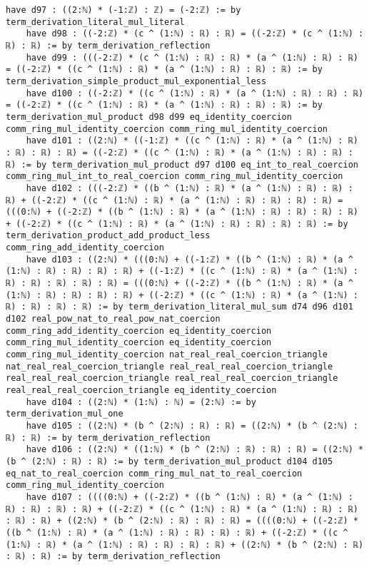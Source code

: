 \documentclass{article}
\begin{document}
\begin{tcolorbox}[colback=white!10, width=\linewidth]
\begin{lstlisting}[language=Lean4]
    have d97 : ((2:ℕ) * (-1:ℤ) : ℤ) = (-2:ℤ) := by term_derivation_literal_mul_literal
    have d98 : ((-2:ℤ) * (c ^ (1:ℕ) : ℝ) : ℝ) = ((-2:ℤ) * (c ^ (1:ℕ) : ℝ) : ℝ) := by term_derivation_reflection
    have d99 : (((-2:ℤ) * (c ^ (1:ℕ) : ℝ) : ℝ) * (a ^ (1:ℕ) : ℝ) : ℝ) = ((-2:ℤ) * ((c ^ (1:ℕ) : ℝ) * (a ^ (1:ℕ) : ℝ) : ℝ) : ℝ) := by term_derivation_simple_product_mul_exponential_less
    have d100 : ((-2:ℤ) * ((c ^ (1:ℕ) : ℝ) * (a ^ (1:ℕ) : ℝ) : ℝ) : ℝ) = ((-2:ℤ) * ((c ^ (1:ℕ) : ℝ) * (a ^ (1:ℕ) : ℝ) : ℝ) : ℝ) := by term_derivation_mul_product d98 d99 eq_identity_coercion comm_ring_mul_identity_coercion comm_ring_mul_identity_coercion
    have d101 : ((2:ℕ) * ((-1:ℤ) * ((c ^ (1:ℕ) : ℝ) * (a ^ (1:ℕ) : ℝ) : ℝ) : ℝ) : ℝ) = ((-2:ℤ) * ((c ^ (1:ℕ) : ℝ) * (a ^ (1:ℕ) : ℝ) : ℝ) : ℝ) := by term_derivation_mul_product d97 d100 eq_int_to_real_coercion comm_ring_mul_int_to_real_coercion comm_ring_mul_identity_coercion
    have d102 : (((-2:ℤ) * ((b ^ (1:ℕ) : ℝ) * (a ^ (1:ℕ) : ℝ) : ℝ) : ℝ) + ((-2:ℤ) * ((c ^ (1:ℕ) : ℝ) * (a ^ (1:ℕ) : ℝ) : ℝ) : ℝ) : ℝ) = (((0:ℕ) + ((-2:ℤ) * ((b ^ (1:ℕ) : ℝ) * (a ^ (1:ℕ) : ℝ) : ℝ) : ℝ) : ℝ) + ((-2:ℤ) * ((c ^ (1:ℕ) : ℝ) * (a ^ (1:ℕ) : ℝ) : ℝ) : ℝ) : ℝ) := by term_derivation_product_add_product_less comm_ring_add_identity_coercion
    have d103 : ((2:ℕ) * (((0:ℕ) + ((-1:ℤ) * ((b ^ (1:ℕ) : ℝ) * (a ^ (1:ℕ) : ℝ) : ℝ) : ℝ) : ℝ) + ((-1:ℤ) * ((c ^ (1:ℕ) : ℝ) * (a ^ (1:ℕ) : ℝ) : ℝ) : ℝ) : ℝ) : ℝ) = (((0:ℕ) + ((-2:ℤ) * ((b ^ (1:ℕ) : ℝ) * (a ^ (1:ℕ) : ℝ) : ℝ) : ℝ) : ℝ) + ((-2:ℤ) * ((c ^ (1:ℕ) : ℝ) * (a ^ (1:ℕ) : ℝ) : ℝ) : ℝ) : ℝ) := by term_derivation_literal_mul_sum d74 d96 d101 d102 real_pow_nat_to_real_pow_nat_coercion comm_ring_add_identity_coercion eq_identity_coercion comm_ring_mul_identity_coercion eq_identity_coercion comm_ring_mul_identity_coercion nat_real_real_coercion_triangle nat_real_real_coercion_triangle real_real_real_coercion_triangle real_real_real_coercion_triangle real_real_real_coercion_triangle real_real_real_coercion_triangle eq_identity_coercion
    have d104 : ((2:ℕ) * (1:ℕ) : ℕ) = (2:ℕ) := by term_derivation_mul_one
    have d105 : ((2:ℕ) * (b ^ (2:ℕ) : ℝ) : ℝ) = ((2:ℕ) * (b ^ (2:ℕ) : ℝ) : ℝ) := by term_derivation_reflection
    have d106 : ((2:ℕ) * ((1:ℕ) * (b ^ (2:ℕ) : ℝ) : ℝ) : ℝ) = ((2:ℕ) * (b ^ (2:ℕ) : ℝ) : ℝ) := by term_derivation_mul_product d104 d105 eq_nat_to_real_coercion comm_ring_mul_nat_to_real_coercion comm_ring_mul_identity_coercion
    have d107 : ((((0:ℕ) + ((-2:ℤ) * ((b ^ (1:ℕ) : ℝ) * (a ^ (1:ℕ) : ℝ) : ℝ) : ℝ) : ℝ) + ((-2:ℤ) * ((c ^ (1:ℕ) : ℝ) * (a ^ (1:ℕ) : ℝ) : ℝ) : ℝ) : ℝ) + ((2:ℕ) * (b ^ (2:ℕ) : ℝ) : ℝ) : ℝ) = ((((0:ℕ) + ((-2:ℤ) * ((b ^ (1:ℕ) : ℝ) * (a ^ (1:ℕ) : ℝ) : ℝ) : ℝ) : ℝ) + ((-2:ℤ) * ((c ^ (1:ℕ) : ℝ) * (a ^ (1:ℕ) : ℝ) : ℝ) : ℝ) : ℝ) + ((2:ℕ) * (b ^ (2:ℕ) : ℝ) : ℝ) : ℝ) := by term_derivation_reflection

\end{lstlisting}
\end{tcolorbox}
\end{document}
